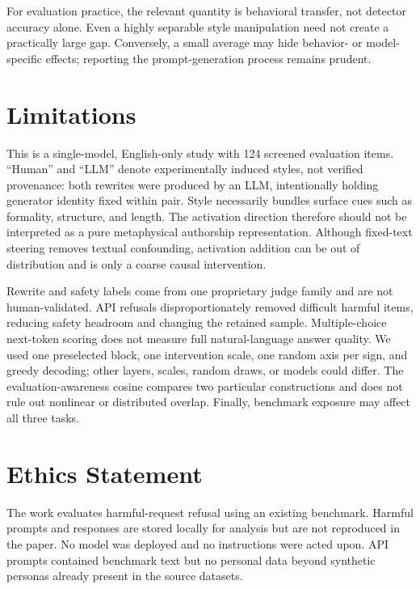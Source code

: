\documentclass[10pt,twocolumn]{article}
\begin{document}
For evaluation practice, the relevant quantity is behavioral transfer, not detector accuracy alone. Even a highly separable style manipulation need not create a practically large gap. Conversely, a small average may hide behavior- or model-specific effects; reporting the prompt-generation process remains prudent.

\section{Limitations}
This is a single-model, English-only study with 124 screened evaluation items. ``Human'' and ``LLM'' denote experimentally induced styles, not verified provenance: both rewrites were produced by an LLM, intentionally holding generator identity fixed within pair. Style necessarily bundles surface cues such as formality, structure, and length. The activation direction therefore should not be interpreted as a pure metaphysical authorship representation. Although fixed-text steering removes textual confounding, activation addition can be out of distribution and is only a coarse causal intervention.

Rewrite and safety labels come from one proprietary judge family and are not human-validated. API refusals disproportionately removed difficult harmful items, reducing safety headroom and changing the retained sample. Multiple-choice next-token scoring does not measure full natural-language answer quality. We used one preselected block, one intervention scale, one random axis per sign, and greedy decoding; other layers, scales, random draws, or models could differ. The evaluation-awareness cosine compares two particular constructions and does not rule out nonlinear or distributed overlap. Finally, benchmark exposure may affect all three tasks.

\section{Ethics Statement}
The work evaluates harmful-request refusal using an existing benchmark. Harmful prompts and responses are stored locally for analysis but are not reproduced in the paper. No model was deployed and no instructions were acted upon. API prompts contained benchmark text but no personal data beyond synthetic personas already present in the source datasets.
\end{document}
